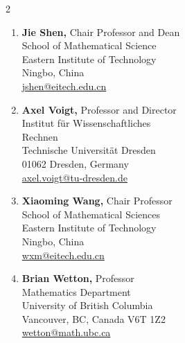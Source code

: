 \documentclass[10pt,letterpaper]{article}
\begin{document}
\begin{multicols}{2}
\begin{enumerate}
	\item
\textbf{Jie Shen,} Chair Professor and Dean
	\\
School of Mathematical Science
	\\
Eastern Institute of Technology
	\\
Ningbo, China
	\\
\href{mailto:jshen@eitech.edu.cn}{jshen@eitech.edu.cn}

 	\item
\textbf{Axel Voigt,} Professor and Director
	\\
Institut f\"{u}r Wissenschaftliches 
	\\
	\hspace*{0.25in} Rechnen
	\\
Technische Universit\"{a}t Dresden
	\\
01062 Dresden, Germany
	\\
\href{mailto:axel.voigt@tu-dresden.de}{axel.voigt@tu-dresden.de}
	
	\item
\textbf{Xiaoming Wang,} Chair Professor
	\\
School of Mathematical Sciences
	\\
Eastern Institute of Technology
	\\
Ningbo, China
	\\
\href{mailto:wxm@eitech.edu.cn}{wxm@eitech.edu.cn}
	\item
\textbf{Brian Wetton,} Professor
	\\
Mathematics Department
	\\
University of British Columbia 
	\\
Vancouver, BC, Canada V6T 1Z2
	\\
\href{mailto:wetton@math.ubc.ca}{wetton@math.ubc.ca}

	\end{enumerate}
	
	\end{multicols}
	
    
\end{document}
